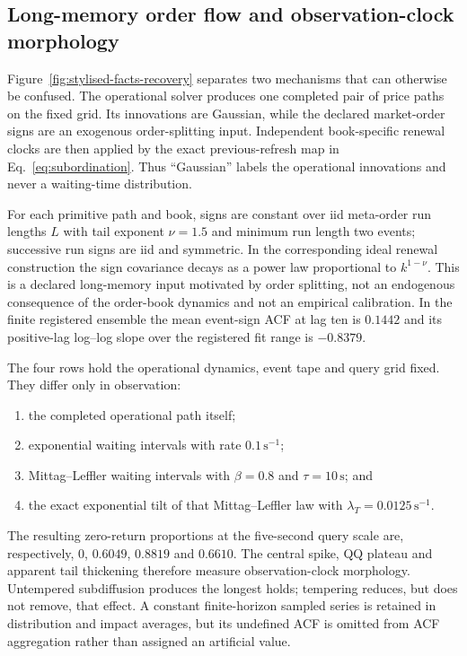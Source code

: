 
\subsection{Long-memory order flow and observation-clock morphology}
\label{app:stylised-facts-recovery}

Figure~\ref{fig:stylised-facts-recovery} separates two mechanisms that can
otherwise be confused.  The operational solver produces one completed pair of
price paths on the fixed grid.  Its innovations are Gaussian, while the
declared market-order signs are an exogenous order-splitting input.  Independent
book-specific renewal clocks are then applied by the exact previous-refresh
map in Eq.~\eqref{eq:subordination}.  Thus ``Gaussian'' labels the operational
innovations and never a waiting-time distribution.

For each primitive path and book, signs are constant over iid meta-order run
lengths $L$ with tail exponent $\nu=1.5$ and minimum run length two events;
successive run signs are iid and symmetric.  In the corresponding ideal
renewal construction the sign covariance decays as a power law proportional
to $k^{1-\nu}$.  This is a declared long-memory input motivated by order
splitting, not an endogenous consequence of the order-book dynamics and not an
empirical calibration.  In the finite registered ensemble the mean event-sign
ACF at lag ten is $0.1442$ and its positive-lag log--log slope over the
registered fit range is $-0.8379$.

The four rows hold the operational dynamics, event tape and query grid fixed.
They differ only in observation:
\begin{enumerate}
\item the completed operational path itself;
\item exponential waiting intervals with rate $0.1\,\mathrm{s}^{-1}$;
\item Mittag--Leffler waiting intervals with $\beta=0.8$ and
  $\tau=10\,\mathrm{s}$; and
\item the exact exponential tilt of that Mittag--Leffler law with
  $\lambda_T=0.0125\,\mathrm{s}^{-1}$.
\end{enumerate}
The resulting zero-return proportions at the five-second query scale are,
respectively, $0$, $0.6049$, $0.8819$ and $0.6610$.  The central spike, QQ
plateau and apparent tail thickening therefore measure observation-clock
morphology.  Untempered subdiffusion produces the longest holds; tempering
reduces, but does not remove, that effect.  A constant finite-horizon sampled
series is retained in distribution and impact averages, but its undefined ACF
is omitted from ACF aggregation rather than assigned an artificial value.


